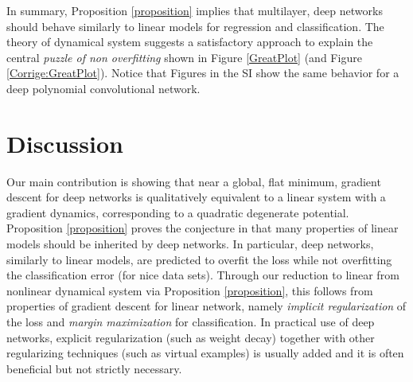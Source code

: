 \documentclass[10pt]{article}
\begin{document}
In summary, Proposition \ref{proposition} implies that multilayer,
deep networks should behave similarly to linear models for regression
and classification. The theory of dynamical system suggests a
satisfactory approach to explain the central {\it puzzle of non
  overfitting} shown in Figure \ref{GreatPlot} (and Figure
\ref{Corrige:GreatPlot}). Notice that Figures in the SI show the same
behavior for a deep polynomial convolutional network.












\section{Discussion}

Our main contribution is showing that near a global, flat minimum,
gradient descent for deep networks is qualitatively equivalent to a
linear system with a gradient dynamics, corresponding to  a quadratic degenerate
potential.  Proposition \ref{proposition} proves the conjecture in
\cite{RosascoRecht2017} that many properties of linear models should be
inherited by deep networks. In particular, deep networks, similarly to  linear
models, are predicted to  overfit the loss while  not overfitting the classification
error (for nice data sets). Through our reduction to linear from
nonlinear dynamical system via Proposition \ref{proposition},  this follows from
properties of gradient descent for linear network, namely {\it
  implicit regularization} of the loss and {\it margin maximization}
for classification. In practical use of deep networks, explicit
regularization (such as weight decay) together with other regularizing
techniques (such as virtual examples) is usually added and it is often
beneficial but not strictly necessary.
\end{document}

